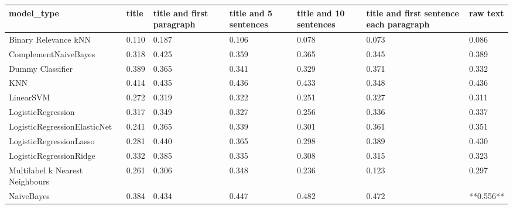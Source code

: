 \begin{tabular}{lllllll}
\toprule
                     model\_type & title & title and first paragraph & title and 5 sentences & title and 10 sentences & title and first sentence each paragraph &  raw text \\
\midrule
           Binary Relevance kNN & 0.110 &                     0.187 &                 0.106 &                  0.078 &                                   0.073 &     0.086 \\
           ComplementNaiveBayes & 0.318 &                     0.425 &                 0.359 &                  0.365 &                                   0.345 &     0.389 \\
               Dummy Classifier & 0.389 &                     0.365 &                 0.341 &                  0.329 &                                   0.371 &     0.332 \\
                            KNN & 0.414 &                     0.435 &                 0.436 &                  0.433 &                                   0.348 &     0.436 \\
                      LinearSVM & 0.272 &                     0.319 &                 0.322 &                  0.251 &                                   0.327 &     0.311 \\
             LogisticRegression & 0.317 &                     0.349 &                 0.327 &                  0.256 &                                   0.336 &     0.337 \\
   LogisticRegressionElasticNet & 0.241 &                     0.365 &                 0.339 &                  0.301 &                                   0.361 &     0.351 \\
        LogisticRegressionLasso & 0.281 &                     0.440 &                 0.365 &                  0.298 &                                   0.389 &     0.430 \\
        LogisticRegressionRidge & 0.332 &                     0.385 &                 0.335 &                  0.308 &                                   0.315 &     0.323 \\
Multilabel k Nearest Neighbours & 0.261 &                     0.306 &                 0.348 &                  0.236 &                                   0.123 &     0.297 \\
                     NaiveBayes & 0.384 &                     0.434 &                 0.447 &                  0.482 &                                   0.472 & **0.556** \\

\end{tabular}
